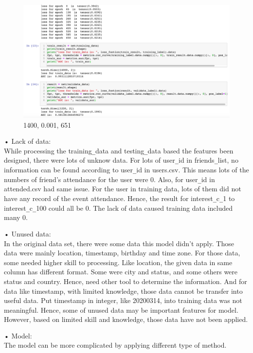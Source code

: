 \documentclass{article}
\begin{document}
\begin{figure}[H]
  \centering
  \includegraphics[width=1.0\textwidth]{img/Picture 14}
  \caption{1400, 0.001, 651}
\end{figure}

•	Lack of data:\\
	While processing the training\verb+_+data and testing\verb+_+data based the features been designed, there were lots of unknow data. For lots of user\verb+_+id in friends\verb+_+list, no information can be found according to user\verb+_+id in users.csv. This means lots of the numbers of friend’s attendance for the user were 0. Also, for user\verb+_+id in attended.csv had same issue. For the user in training data, lots of them did not have any record of the event attendance. Hence, the result for interest\verb+_+c\verb+_+1 to interest\verb+_+c\verb+_+100 could all be 0. The lack of data caused training data included many 0.
	
•	Unused data:\\
	In the original data set, there were some data this model didn’t apply. Those data were mainly location, timestamp, birthday and time zone. For those data, some needed higher skill to processing. Like location, the given data in same column has different format. Some were city and status, and some others were status and country. Hence, need other tool to determine the information. And for data like timestamp, with limited knowledge, those data cannot be transfer into useful data. Put timestamp in integer, like 20200314, into training data was not meaningful. Hence, some of unused data may be important features for model. However, based on limited skill and knowledge, those data have not been applied.
	
•	Model:\\
	The model can be more complicated by applying different type of method.
	
\end{document}
